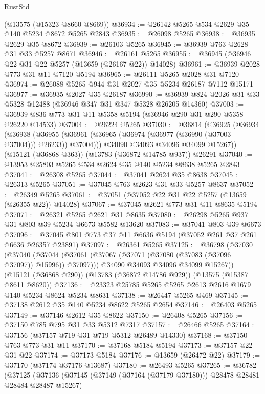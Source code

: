 \begin{lexlean}{RustStd}
\begin{coremodule}
    (@13575 (@15323 @8660 @8669))
@36934 := @26142 @5265 @534 @2629 @35 @140 @5234 @8672 @5265 @2843
@36935 := @26098 @5265
@36938 := @36935 @2629 @35 @8672
@36939 := @26103 @5265
@36945 := @36939 @763 @2628 @31 @33 @5257 @8671
@36946 := @26161 @5265
@36955 := @36945 (@36946 @22 @31 @22 @5257 (@13659 (@26167 @22)) @14028)
@36961 := @36939 @2028 @773 @31 @11 @7120 @5194
@36965 := @26111 @5265 @2028 @31 @7120
@36974 := @26088 @5265 @944 @31 @2027 @35 @5234 @26187 @7112 @15171
@36977 := @36935 @2027 @35 @26187
@36990 := @36939 @824 @2026 @31 @33 @5328 @12488 (@36946 @347 @31 @347 @5328 @26205 @14360)
@37003 := @36939 @836 @773 @31 @11 @5358 @5194 (@36946 @290 @31 @290 @5358 @26220 @14533)
@37004 := @26224 @5265
@37030 := @36814
    (@36925
      (@36934
        (@36938 (@36955 (@36961 (@36965 (@36974 (@36977 (@36990 (@37003 @37004))) @26233)) @37004)))
        @34090
        @34093
        @34096
        @34099
        @15267))
    (@15121 (@36868 @363))
    (@13783 (@36872 @14785 @937))
    @26291
@37040 := @13953 @25803 @5265 @534 @2624 @35 @140 @5234 @8638 @5265 @2843
@37041 := @26308 @5265
@37044 := @37041 @2624 @35 @8638
@37045 := @26313 @5265
@37051 := @37045 @763 @2623 @31 @33 @5257 @8637
@37052 := @26349 @5265
@37061 := @37051 (@37052 @22 @31 @22 @5257 (@13659 (@26355 @22)) @14028)
@37067 := @37045 @2621 @773 @31 @11 @8635 @5194
@37071 := @26321 @5265 @2621 @31 @8635
@37080 := @26298 @5265 @937 @31 @803 @39 @5234 @6673 @5582 @13620
@37083 := @37041 @803 @39 @6673
@37096 := @37045 @801 @773 @37 @11 @6636 @5194 (@37052 @261 @37 @261 @6636 @26357 @23891)
@37097 := @26361 @5265
@37125 := @36798
    (@37030
      (@37040
        (@37044 (@37061 (@37067 (@37071 (@37080 (@37083 (@37096 @37097)) @15996)) @37097)))
        @34090
        @34093
        @34096
        @34099
        @15267))
    (@15121 (@36868 @290))
    (@13783 (@36872 @14786 @929))
    (@13575 (@15387 @8611 @8620))
@37136 := @23323 @25785 @5265 @5265 @2613 @2616 @1679 @140 @5234 @8624 @5234 @8631
@37138 := @26447 @5265 @469
@37145 := @37138 @2612 @35 @140 @5234 @8622 @5265 @2654
@37146 := @26403 @5265
@37149 := @37146 @2612 @35 @8622
@37150 := @26408 @5265
@37156 := @37150 @785 @795 @31 @33 @5312 @7317
@37157 := @26466 @5265
@37164 := @37156 (@37157 @719 @31 @719 @5312 @26489 @14330)
@37168 := @37150 @763 @773 @31 @11
@37170 := @37168 @5184 @5194
@37173 := @37157 @22 @31 @22
@37174 := @37173 @5184
@37176 := @13659 (@26472 @22)
@37179 := @37170 (@37174 @37176 @13687)
@37180 := @26493 @5265
@37265 := @36782
    (@37125
      (@37136
        (@37145 (@37149 (@37164 (@37179 @37180))) @28478 @28481 @28484 @28487 @15267)

\end{coremodule}
\end{lexlean}
